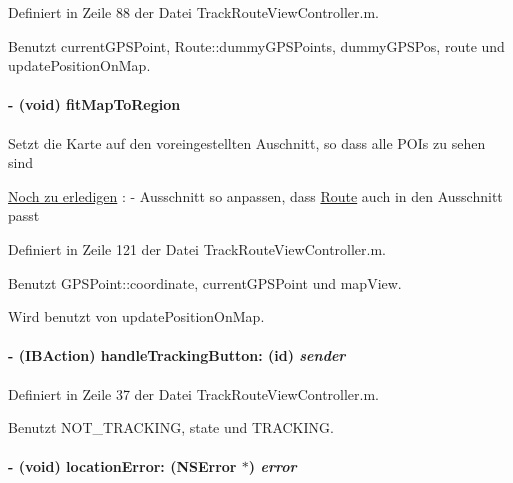 Definiert in Zeile 88 der Datei TrackRouteViewController.m.

Benutzt currentGPSPoint, Route::dummyGPSPoints, dummyGPSPos, route und updatePositionOnMap.\hypertarget{interface_track_route_view_controller_a318fa1634b09695c451368949fd6b7d8}{
\paragraph[{fitMapToRegion}]{\setlength{\rightskip}{0pt plus 5cm}-\/ (void) fitMapToRegion }\hfill}
\label{interface_track_route_view_controller_a318fa1634b09695c451368949fd6b7d8}
Setzt die Karte auf den voreingestellten Auschnitt, so dass alle POIs zu sehen sind \begin{Desc}
\item[\hyperlink{todo__todo000002}{Noch zu erledigen}]: -\/ Ausschnitt so anpassen, dass \hyperlink{interface_route}{Route} auch in den Ausschnitt passt \end{Desc}


Definiert in Zeile 121 der Datei TrackRouteViewController.m.

Benutzt GPSPoint::coordinate, currentGPSPoint und mapView.

Wird benutzt von updatePositionOnMap.\hypertarget{interface_track_route_view_controller_a2cfd0c048bca5a6eb507e2a34160ce7c}{
\paragraph[{handleTrackingButton:}]{\setlength{\rightskip}{0pt plus 5cm}-\/ (IBAction) handleTrackingButton: (id) {\em sender}}\hfill}
\label{interface_track_route_view_controller_a2cfd0c048bca5a6eb507e2a34160ce7c}


Definiert in Zeile 37 der Datei TrackRouteViewController.m.

Benutzt NOT\_\-TRACKING, state und TRACKING.\hypertarget{interface_track_route_view_controller_a451898caf9041899f09f3c7afa57dc8b}{
\paragraph[{locationError:}]{\setlength{\rightskip}{0pt plus 5cm}-\/ (void) locationError: (NSError $\ast$) {\em error}}\hfill}
\label{interface_track_route_view_controller_a451898caf9041899f09f3c7afa57dc8b}


